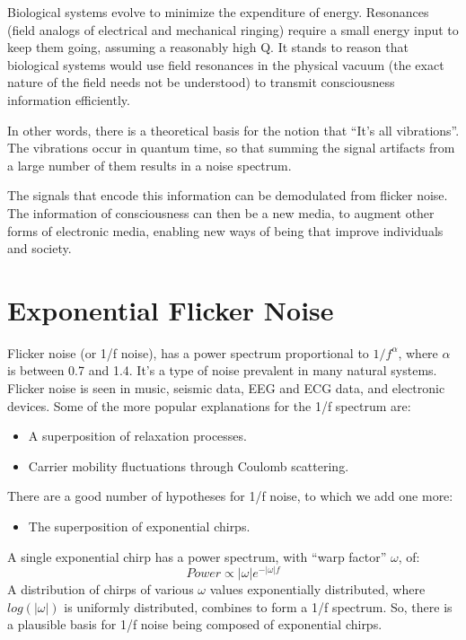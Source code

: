 Biological systems evolve to minimize the expenditure of energy. Resonances
(field analogs of electrical and mechanical ringing) require a small energy
input to keep them going, assuming a reasonably high Q. It stands to reason
that biological systems would use field resonances in the physical vacuum
(the exact nature of the field needs not be understood)
to transmit consciousness information efficiently.

In other words, there is a theoretical basis for the notion that
``It's all vibrations''.
The vibrations occur in quantum time, so that summing the signal artifacts
from a large number of them results in a noise spectrum.

The signals that encode this information can be demodulated from flicker noise.
The information of consciousness can then be a new media,
to augment other forms of electronic media,
enabling new ways of being that improve individuals and society.

\section{Exponential Flicker Noise}

Flicker noise (or 1/f noise), has a power spectrum proportional to
$1/f^{\alpha}$, where $\alpha$ is between 0.7 and 1.4.
It's a type of noise prevalent in many natural systems.
Flicker noise \cite{Milotti} is seen in music, seismic data, EEG and ECG data,
and electronic devices.
Some of the more popular explanations for the 1/f spectrum are:
\begin{itemize}
	\item A superposition of relaxation processes.
	\item Carrier mobility fluctuations through Coulomb scattering.
\end{itemize}
There are a good number of hypotheses for 1/f noise, to which we add one more:
\begin{itemize}
	\item The superposition of exponential chirps.
\end{itemize}
A single exponential chirp has a power spectrum,
with ``warp factor'' $\omega$, of:
\begin{equation}
Power \propto |\omega| e^{-|\omega|f}
\end{equation}
A distribution of chirps of various $\omega$ values exponentially distributed,
where $log(|\omega|)$ is uniformly distributed, combines to form a 1/f spectrum.
So, there is a plausible basis for 1/f noise being composed of exponential
chirps.

